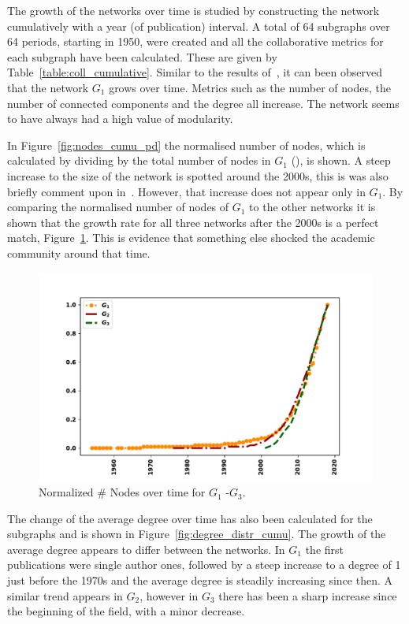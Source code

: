 \documentclass{article}
\theoremstyle{definition}
\newcommand{\authors}{}
\begin{document}
The growth of the networks over time is studied by constructing the network
cumulatively with a year (of publication) interval. A total of 64 subgraphs
over 64 periods, starting in 1950, were created and all the collaborative metrics
for each subgraph have been calculated. These are given by Table~\ref{table:coll_cumulative}.
Similar to the results of~\cite{Liu2015}, it can been observed that the network \(G_1\)
grows over time. Metrics such as the number of nodes, the number of connected components and
the degree all increase. The network seems to have always had a high value of modularity.

In Figure~\ref{fig:nodes_cumu_pd} the normalised number of nodes,
which is calculated by dividing by the total number of nodes in \(G_1\) (\authors),
is shown. A steep increase to the size of the network is spotted around the 2000s,
this is was also briefly comment upon in~\cite{Liu2015}. However, that increase
does not appear only in \(G_1\). By comparing the normalised
number of nodes of \(G_1\) to the other networks it is shown that the growth rate
for all three networks after the 2000s is a perfect match, Figure~\ref{fig:nodes_cumu}.
This is evidence that something else shocked the academic community around that time.

\begin{figure}[!hbtp]
    \begin{minipage}{.45\textwidth}
        \centering
        \includegraphics[width=\textwidth]{./assets/images/percentage_networks_nodes.pdf}
        \caption{Normalized \# Nodes over time for \(G_1\) -\(G_3\).}\label{fig:nodes_cumu}
    \end{minipage}
\end{figure}

The change of the average degree over time has also been calculated for the
subgraphs and is shown in Figure~\ref{fig:degree_distr_cumu}. The growth of
the average degree appears to differ between the networks. In \(G_1\) the first
publications were single author ones, followed by a steep increase
to a degree of 1 just before the 1970s and the average degree is steadily increasing
since then. A similar trend appears in \(G_2\), however in \(G_3\)
there has been a sharp increase since the beginning of the field, with
a minor decrease.
\end{document}
